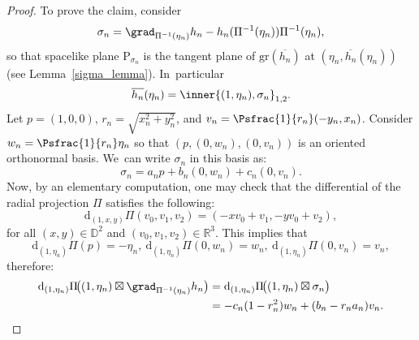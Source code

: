 \begin{proof}
To prove the claim, consider
\[
\sigma_n=\grad_{\Pi^{-1}(\eta_n)}h_n-h_n(\Pi^{-1}(\eta_n))\Pi^{-1}(\eta_n),
\]
so that spacelike plane $\mathrm{P}_{\sigma_n}$ is the tangent plane of $\mathrm{gr}(\overline{h_n})$ at $(\eta_n,\overline{h_n}(\eta_n))$ (see Lem\-ma~\ref{sigma_lemma}). In~particular
\begin{equation}\label{u(pi2)}
\overline{h_n}(\eta_n)= \inner{(1,\eta_n),\sigma_n}_{1,2}.
\end{equation}
Let $p = (1, 0, 0)$, $r_n = \sqrt{x_n^2 + y_n^2}$, and $v_n = \Psfrac{1}{r_n}(-y_n, x_n)$. Consider $w_n = \Psfrac{1}{r_n}\eta_n$ so that $(p, (0,w_n), (0,v_n))$ is an oriented orthonormal basis. We~can write $\sigma_n$ in this basis as: \begin{equation}\label{sigma_n}
\sigma_n=a_np+b_n(0,w_n)+c_n(0,v_n).
\end{equation}
Now, by an elementary computation, one may check that the differential of the radial projection $\Pi$ satisfies the following:
\[
\mathrm{d}_{(1,x,y)}\Pi(v_0,v_1,v_2)=(-x v_0+v_1, -y v_0+v_2),
\]
for all $(x,y)\in\mathbb{D}^2$ and $(v_0,v_1,v_2)\in\mathbb{R}^3$. This implies that
\[
\mathrm{d}_{(1,\eta_n)}\Pi(p) = -\eta_n,\ \mathrm{d}_{(1,\eta_n)}\Pi(0,w_n) = w_n, \ \mathrm{d}_{(1,\eta_n)}\Pi(0,v_n) = v_n,
\]
therefore:
\begin{equation}\label{pullback_of_vector_field2}
\begin{aligned}
\mathrm{d}_{(1,\eta_n)}\Pi\!\bigl((1,\eta_n)\boxtimes
\grad_{\Pi^{-1}(\eta_n)} h_n\bigr)
&= \mathrm{d}_{(1,\eta_n)}\Pi\!\bigl((1,\eta_n)\boxtimes\sigma_n\bigr) \\
&= -c_n(1-r_n^2)w_n + (b_n-r_na_n)v_n.
\end{aligned}
\end{equation}


\end{proof}
